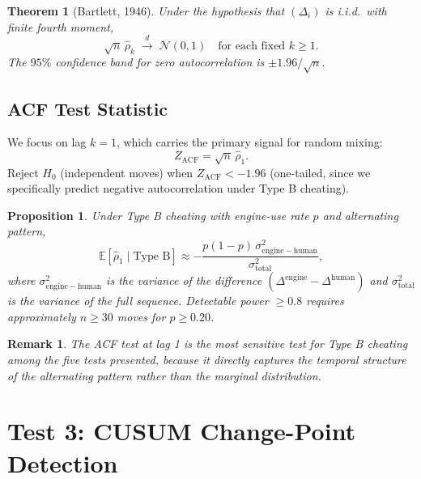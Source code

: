\documentclass[11pt,a4paper]{article}
\newtheorem{proposition}{Proposition}
\newtheorem{theorem}{Theorem}
\newtheorem{remark}{Remark}
\begin{document}
\begin{theorem}[Bartlett, 1946]
Under the hypothesis that $(\Delta_i)$ is i.i.d.\ with finite fourth moment,
\begin{equation}
  \sqrt{n}\,\hat{\rho}_k \;\xrightarrow{d}\; \mathcal{N}(0, 1)
  \quad \text{for each fixed } k \geq 1.
  \label{eq:bartlett}
\end{equation}
The $95\%$ confidence band for zero autocorrelation is $\pm 1.96/\sqrt{n}$.
\end{theorem}

\subsection{ACF Test Statistic}

We focus on lag $k = 1$, which carries the primary signal for random mixing:
\begin{equation}
  Z_{\mathrm{ACF}} = \sqrt{n}\,\hat{\rho}_1.
\end{equation}
Reject $H_0$ (independent moves) when $Z_{\mathrm{ACF}} < -1.96$
(one-tailed, since we specifically predict negative autocorrelation
under Type B cheating).

\begin{proposition}
\label{prop:acf_expectation}
Under Type B cheating with engine-use rate $p$ and alternating pattern,
\begin{equation}
  \mathbb{E}[\hat{\rho}_1 \mid \text{Type B}]
  \approx -\frac{p(1-p)\,\sigma^2_{\mathrm{engine-human}}}
  {\sigma^2_{\mathrm{total}}},
\end{equation}
where $\sigma^2_{\mathrm{engine-human}}$ is the variance of the difference
$(\Delta^{\mathrm{engine}} - \Delta^{\mathrm{human}})$ and
$\sigma^2_{\mathrm{total}}$ is the variance of the full sequence.
Detectable power $\geq 0.8$ requires approximately $n \geq 30$ moves
for $p \geq 0.20$.
\end{proposition}

\begin{remark}
The ACF test at lag 1 is the most sensitive test for Type B cheating
among the five tests presented, because it directly captures the
temporal structure of the alternating pattern rather than the marginal
distribution.
\end{remark}

\section{Test 3: CUSUM Change-Point Detection}
\label{sec:cusum}
\end{document}
